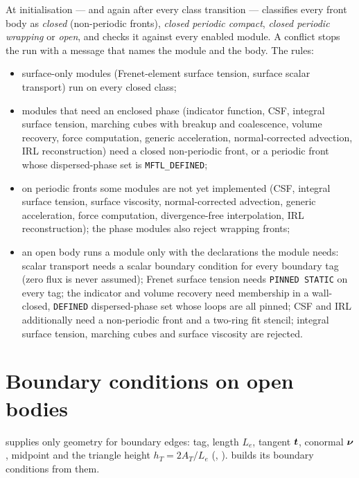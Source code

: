 At initialisation --- and again after every class transition --- \multi{} classifies every front
body as \emph{closed} (non-periodic fronts), \emph{closed periodic compact}, \emph{closed periodic
wrapping} or \emph{open}, and checks it against every enabled module. A conflict stops the run with
a message that names the module and the body. The rules:
\begin{itemize}
  \item surface-only modules (Frenet-element surface tension, surface scalar transport) run on
    every closed class;
  \item modules that need an enclosed phase (indicator function, CSF, integral surface tension,
    marching cubes with breakup and coalescence, volume recovery, force computation, generic
    acceleration, normal-corrected advection, IRL reconstruction) need a closed non-periodic
    front, or a periodic front whose dispersed-phase set is \texttt{MFTL\_DEFINED};
  \item on periodic fronts some modules are not yet implemented (CSF, integral surface tension,
    surface viscosity, normal-corrected advection, generic acceleration, force computation,
    divergence-free interpolation, IRL reconstruction); the phase modules also reject wrapping
    fronts;
  \item an open body runs a module only with the declarations the module needs: scalar
    transport needs a scalar boundary condition for every boundary tag (zero flux is never
    assumed); Frenet surface tension needs \texttt{PINNED STATIC} on every tag; the indicator
    and volume recovery need membership in a wall-closed, \texttt{DEFINED} dispersed-phase set whose
    loops are all pinned; CSF and IRL additionally need a non-periodic front and a two-ring
    fit stencil; integral surface tension, marching cubes and surface viscosity are rejected.
\end{itemize}

\section{Boundary conditions on open bodies}
\label{sec:mf-bcs}

\mftl{} supplies only geometry for boundary edges: tag, length $L_e$, tangent $\boldsymbol{t}$, conormal
$\boldsymbol{\nu}$, midpoint and the triangle height $h_T=2A_T/L_e$
(, ). \multi{} builds its
boundary conditions from them.

